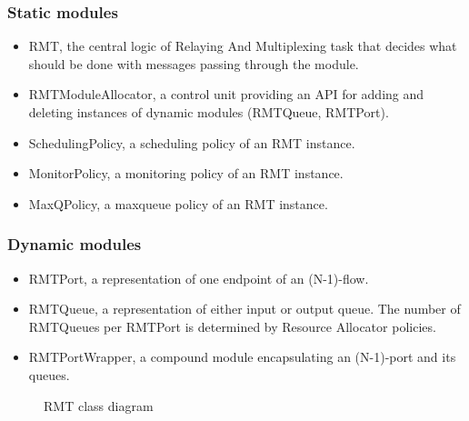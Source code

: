             \subsubsection{Static modules}
            \begin{itemize}
                \item RMT, the central logic of Relaying And Multiplexing task that decides what should be done with messages passing through the module.
                \item RMTModuleAllocator, a control unit providing an API for adding and deleting instances of dynamic modules (RMTQueue, RMTPort).
                \item SchedulingPolicy, a scheduling policy of an RMT instance.
                \item MonitorPolicy, a monitoring policy of an RMT instance.
                \item MaxQPolicy, a maxqueue policy of an RMT instance.
            \end{itemize}

            \subsubsection{Dynamic modules}
            \begin{itemize}
                \item RMTPort, a representation of one endpoint of an (N-1)-flow.
                \item RMTQueue, a representation of either input or output queue. The number of RMTQueues per RMTPort is determined by Resource Allocator policies.
                \item RMTPortWrapper, a compound module encapsulating an (N-1)-port and its queues.
            \end{itemize}

            \begin{figure}[H]
                \begin{center}
                  \caption{RMT class diagram}
                  \label{fig:rmt-erd}
                \end{center}
            \end{figure}

